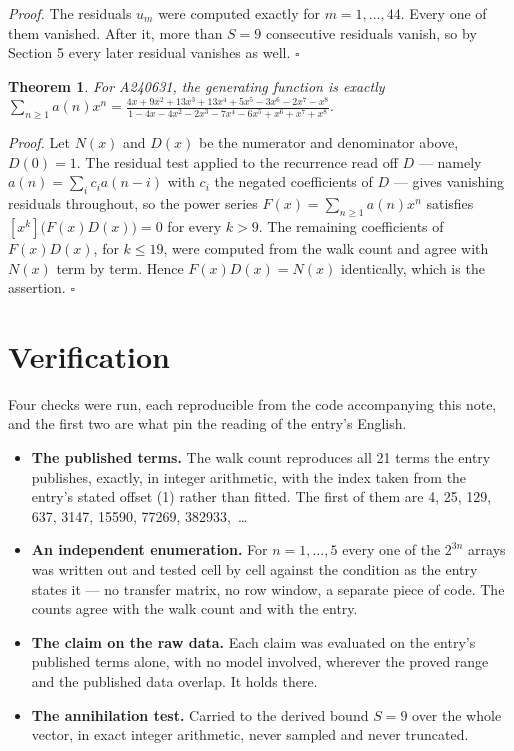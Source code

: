 \documentclass[11pt]{article}
\newtheorem{theorem}{Theorem}
\theoremstyle{definition}
\begin{document}
{\itshape Proof.} The residuals $u_m$ were computed exactly for $m = 1,\dots,44$. Every one of them vanished. After it, more than $S = 9$ consecutive residuals vanish, so by Section 5 every later residual vanishes as well. $\square$

\begin{theorem} For A240631, the generating function is exactly $\sum_{n\ge 1} a(n)x^n = \frac{4x + 9x^{2} + 13x^{3} + 13x^{4} + 5x^{5} - 3x^{6} - 2x^{7} - x^{8}}{1 - 4x - 4x^{2} - 2x^{3} - 7x^{4} - 6x^{5} + x^{6} + x^{7} + x^{8}}$.\end{theorem}

{\itshape Proof.} Let $N(x)$ and $D(x)$ be the numerator and denominator above, $D(0)=1$. The residual test applied to the recurrence read off $D$ --- namely $a(n) = \sum_i c_i a(n-i)$ with $c_i$ the negated coefficients of $D$ --- gives vanishing residuals throughout, so the power series $F(x)=\sum_{n\ge 1}a(n)x^n$ satisfies $[x^k]\bigl(F(x)D(x)\bigr) = 0$ for every $k > 9$. The remaining coefficients of $F(x)D(x)$, for $k \le 19$, were computed from the walk count and agree with $N(x)$ term by term. Hence $F(x)D(x) = N(x)$ identically, which is the assertion. $\square$

\section{Verification}

Four checks were run, each reproducible from the code accompanying this note, and the first two are what pin the reading of the entry's English.

\begin{itemize}

\item {\bfseries The published terms.} The walk count reproduces all 21 terms the entry publishes, exactly, in integer arithmetic, with the index taken from the entry's stated offset (1) rather than fitted. The first of them are 4, 25, 129, 637, 3147, 15590, 77269, 382933,~\dots

\item {\bfseries An independent enumeration.} For $n = 1,\dots,5$ every one of the $2^{3n}$ arrays was written out and tested cell by cell against the condition as the entry states it --- no transfer matrix, no row window, a separate piece of code. The counts agree with the walk count and with the entry.

\item {\bfseries The claim on the raw data.} Each claim was evaluated on the entry's published terms alone, with no model involved, wherever the proved range and the published data overlap. It holds there.

\item {\bfseries The annihilation test.} Carried to the derived bound $S = 9$ over the whole vector, in exact integer arithmetic, never sampled and never truncated.

\end{itemize}
\end{document}
